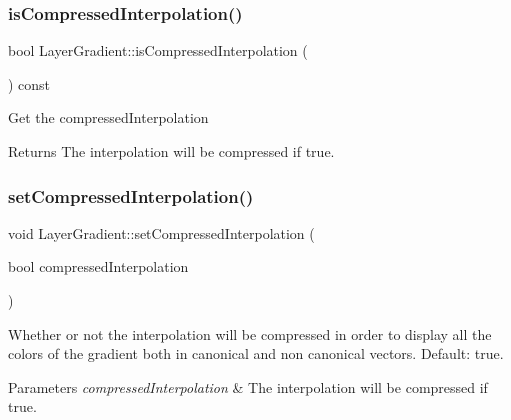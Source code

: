 \subsubsection{\texorpdfstring{is\+Compressed\+Interpolation()}{isCompressedInterpolation()}\hspace{0.1cm}{\footnotesize\ttfamily [2/2]}}
{\footnotesize\ttfamily bool Layer\+Gradient\+::is\+Compressed\+Interpolation (\begin{DoxyParamCaption}{ }\end{DoxyParamCaption}) const}

Get the compressed\+Interpolation

\begin{DoxyReturn}{Returns}
The interpolation will be compressed if true. 
\end{DoxyReturn}
\mbox{\label{classLayerGradient_a2fff019a1124d56ebea72ce4119d5309}} 
\subsubsection{\texorpdfstring{set\+Compressed\+Interpolation()}{setCompressedInterpolation()}\hspace{0.1cm}{\footnotesize\ttfamily [1/2]}}
{\footnotesize\ttfamily void Layer\+Gradient\+::set\+Compressed\+Interpolation (\begin{DoxyParamCaption}\item[{bool}]{compressed\+Interpolation }\end{DoxyParamCaption})}

Whether or not the interpolation will be compressed in order to display all the colors of the gradient both in canonical and non canonical vectors. Default\+: true.


\begin{DoxyParams}{Parameters}
{\em compressed\+Interpolation} & The interpolation will be compressed if true. \\
\hline
\end{DoxyParams}
\mbox{\label{classLayerGradient_a2fff019a1124d56ebea72ce4119d5309}} 
